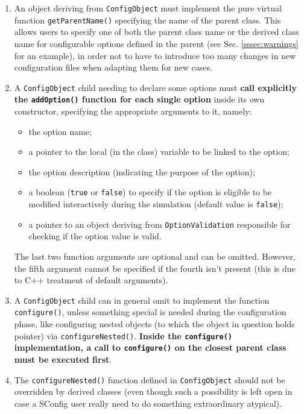 \documentclass[11pt]{article}
\begin{document}
\begin{enumerate}
\item
  An object deriving from \texttt{ConfigObject} must implement the pure virtual
  function \texttt{getParentName()} specifying the name of the parent 
  class. This allows users to specify one of both the parent class name or the
  derived class name for configurable options defined in the parent (see
  Sec. \ref{sssec:warnings} for an example), in order not to have to
  introduce too many changes in new configuration files when adapting
  them for new cases.
\item
  A \texttt{ConfigObject} child needing to declare some options
  must \textbf{call explicitly the \texttt{addOption()} function for each
    single option} inside its own constructor, specifying the
  appropriate arguments to it, namely:
  \begin{itemize}
  \item the option name;
  \item a pointer to the local (in the class) variable to be linked to
    the option;
  \item the option description (indicating the purpose of the option);   
  \item a boolean (\texttt{true} or \texttt{false}) to specify if the
    option is eligible to be modified interactively during the
    simulation (default value is \texttt{false});
  \item a pointer to an object deriving from \texttt{OptionValidation}
    responsible for checking if the option value is valid.    
  \end{itemize}
  The last two function arguments are optional and can be omitted. 
  However, the fifth argument cannot be specified if the fourth 
  isn't present (this is due to C++ treatment of default arguments).
\item 
  A \texttt{ConfigObject} child can in general omit to implement 
  the function \texttt{configure()}, unless something special is
  needed during the configuration phase, like configuring nested 
  objects (to which the object in question holds pointer) via 
  \texttt{configureNested()}. \textbf{Inside the \texttt{configure()} implementation, a
    call to \texttt{configure()} on the closest parent 
    class must be executed first}.
\item
  The \texttt{configureNested()} function defined in 
  \texttt{ConfigObject} should not be overridden by derived 
  classes (even though such a possibility is left open in case a 
  SConfig user really need to do something extraordinary atypical).
\end{enumerate}
\end{document}

